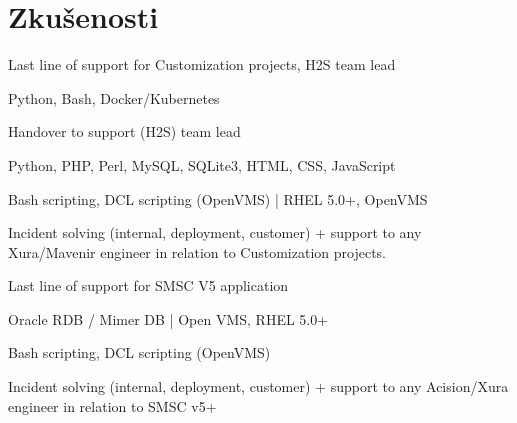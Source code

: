 \documentclass[letterpaper]{deedy-resume.cz} %
\begin{document}
\begin{minipage}[t]{0.60\textwidth} %

\section{Zkušenosti}

\vspace{\topsep} %
\begin{tightitemize}
\item Last line of support for Customization projects, H2S team lead
\item Python, Bash, Docker/Kubernetes
\end{tightitemize}
\sectionspace %

\begin{tightitemize}
\item Handover to support (H2S) team lead
\item Python, PHP, Perl, MySQL, SQLite3, HTML, CSS, JavaScript
\item Bash scripting, DCL scripting (OpenVMS) | RHEL 5.0+, OpenVMS
\item Incident solving (internal, deployment, customer) + support to any Xura/Mavenir engineer in relation to Customization projects.
\end{tightitemize}
\sectionspace %

\begin{tightitemize}
\item Last line of support for SMSC V5 application
\item Oracle RDB / Mimer DB |  Open VMS, RHEL 5.0+
\item Bash scripting, DCL scripting (OpenVMS)
\item Incident solving (internal, deployment, customer) + support to any Acision/Xura engineer in relation to SMSC v5+
\end{tightitemize}
\sectionspace %


\end{minipage}
\end{document}
